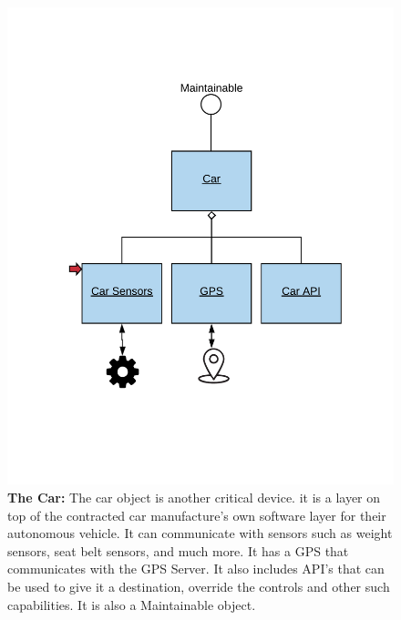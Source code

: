 \documentclass[12pt]{article}
\begin{document}
\begin{figure}[H]
    \centerline{\includegraphics[scale=.20]{Car.png}}
    \caption{\textbf{The Car: }The car object is another critical device. it is a layer on top of the contracted car 
manufacture's own software layer for their autonomous vehicle. It can communicate with sensors such as 
weight sensors, seat belt sensors, and much more. It has a GPS that communicates with the GPS Server. 
It also includes API's that can be used to give it a destination, override the controls and other such 
capabilities. It is also a Maintainable object.}
    \label{fig:Car}
\end{figure}
\end{document}
